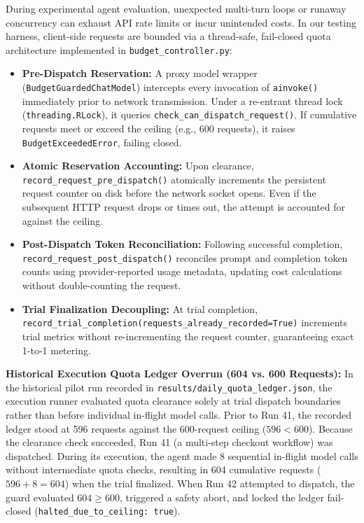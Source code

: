 \documentclass[11pt,a4paper]{article}
\begin{document}
During experimental agent evaluation, unexpected multi-turn loops or runaway concurrency can exhaust API rate limits or incur unintended costs. In our testing harness, client-side requests are bounded via a thread-safe, fail-closed quota architecture implemented in \texttt{budget\_controller.py}:
\begin{itemize}
    \item \textbf{Pre-Dispatch Reservation:} A proxy model wrapper (\texttt{BudgetGuardedChatModel}) intercepts every invocation of \texttt{ainvoke()} immediately prior to network transmission. Under a re-entrant thread lock (\texttt{threading.RLock}), it queries \texttt{check\_can\_dispatch\_request()}. If cumulative requests meet or exceed the ceiling (e.g., 600 requests), it raises \texttt{BudgetExceededError}, failing closed.
    \item \textbf{Atomic Reservation Accounting:} Upon clearance, \texttt{record\_request\_pre\_dispatch()} atomically increments the persistent request counter on disk before the network socket opens. Even if the subsequent HTTP request drops or times out, the attempt is accounted for against the ceiling.
    \item \textbf{Post-Dispatch Token Reconciliation:} Following successful completion, \texttt{record\_request\_post\_dispatch()} reconciles prompt and completion token counts using provider-reported usage metadata, updating cost calculations without double-counting the request.
    \item \textbf{Trial Finalization Decoupling:} At trial completion, \texttt{record\_trial\_completion(requests\_already\_recorded=True)} increments trial metrics without re-incrementing the request counter, guaranteeing exact 1-to-1 metering.
\end{itemize}

\textbf{Historical Execution Quota Ledger Overrun (604 vs. 600 Requests):}
In the historical pilot run recorded in \texttt{results/daily\_quota\_ledger.json}, the execution runner evaluated quota clearance solely at trial dispatch boundaries rather than before individual in-flight model calls. Prior to Run 41, the recorded ledger stood at 596 requests against the 600-request ceiling ($596 < 600$). Because the clearance check succeeded, Run 41 (a multi-step checkout workflow) was dispatched. During its execution, the agent made 8 sequential in-flight model calls without intermediate quota checks, resulting in 604 cumulative requests ($596 + 8 = 604$) when the trial finalized. When Run 42 attempted to dispatch, the guard evaluated $604 \ge 600$, triggered a safety abort, and locked the ledger fail-closed (\texttt{halted\_due\_to\_ceiling: true}). 
\end{document}

